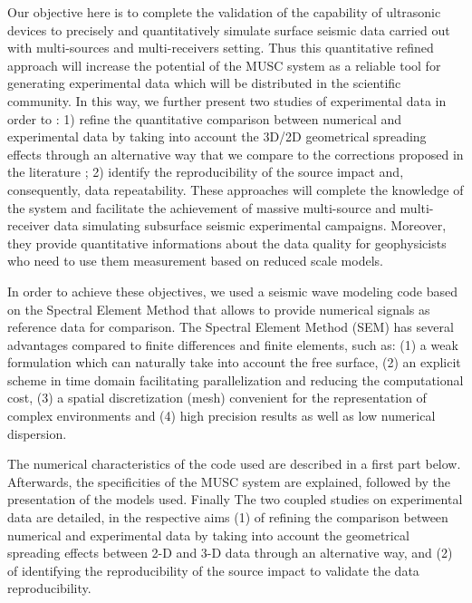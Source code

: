 \documentclass[manuscript,revised]{geophysics}
\newcommand{\twod}{2-D }
\newcommand{\thrd}{3-D }
\begin{document}
\noindent Our objective here is to complete the validation of the capability of ultrasonic devices to precisely and quantitatively simulate surface seismic data carried out with multi-sources and multi-receivers setting. Thus this quantitative refined approach will increase the potential of the MUSC system as a reliable tool for generating experimental data which will be distributed in the scientific community.
\noindent In this way, we further present two studies of experimental data in order to : 1) refine the quantitative comparison between numerical and experimental data by taking into account the 3D/2D geometrical spreading effects through an alternative way that we compare to the corrections proposed in the literature ; 2) identify the reproducibility of the source impact and, consequently, data repeatability. These approaches will complete the knowledge of the system and facilitate the achievement of massive multi-source and multi-receiver data simulating subsurface seismic experimental campaigns. Moreover, they provide quantitative informations about the data quality for geophysicists who need to use them measurement based on reduced scale models. 

\noindent In order to achieve these objectives, we used a seismic wave modeling code based on the Spectral Element Method \citep{Komatitsch_SEM_1998,Komatitsch_ISM_1999,Komatitsch_SEM_2005,Festa_PML_2005} that allows to provide numerical signals as reference data for comparison. The Spectral Element Method (SEM) has several advantages compared to finite differences and finite elements, such as: (1) a weak formulation which can naturally take into account the free surface, (2) an explicit scheme in time domain facilitating parallelization and reducing the computational cost, (3) a spatial discretization (mesh) convenient for the representation of complex environments and (4) high precision results as well as low numerical dispersion.


\noindent The numerical characteristics of the code used are described in a first part below. Afterwards, the specificities of the MUSC system are explained, followed by the presentation of the models used. Finally The two coupled studies on experimental data are detailed, in the respective aims (1) of refining the comparison between numerical and experimental data by taking into account the geometrical spreading effects between \twod and \thrd data through an alternative way, and (2) of identifying the reproducibility of the source impact to validate the data reproducibility.
\end{document}
